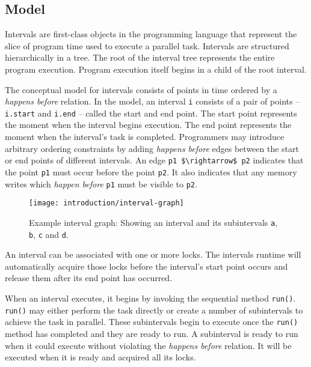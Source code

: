 \subsection{Model}
\label{sec:intro-intervals-model}

Intervals are first-class objects in the programming language that
represent the slice of program time used to execute a parallel
task. Intervals are structured hierarchically in a tree. The root of
the interval tree represents the entire program execution. Program
execution itself begins in a child of the root interval.

The conceptual model for intervals consists of points in time ordered
by a \emph{happens before} relation. In the model, an interval
\lstinline|i| consists of a pair of points -- \lstinline|i.start| and
\lstinline|i.end| -- called the start and end point. The start point
represents the moment when the interval begins execution. The end
point represents the moment when the interval's task is
completed. Programmers may introduce arbitrary ordering constraints by
adding \emph{happens before} edges between the start or end points of
different intervals. An edge \lstinline|p1 $\rightarrow$ p2| indicates
that the point \lstinline|p1| must occur before the point
\lstinline|p2|. It also indicates that any memory writes which
\emph{happen before} \lstinline|p1| must be visible to
\lstinline|p2|.

\begin{figure}[htb]
  \centering
  \texttt{[image: introduction/interval-graph]}
  \caption[Example interval graph]{Example interval graph: Showing an
    interval and its subintervals \lstinline|a|, \lstinline|b|,
    \lstinline|c| and \lstinline|d|.}
  \label{fig:interval-graph}
\end{figure}

An interval can be associated with one or more locks. The intervals
runtime will automatically acquire those locks before the interval's
start point occurs and release them after its end point has occurred.

When an interval executes, it begins by invoking the sequential method
\lstinline|run()|. \lstinline|run()| may either perform the task
directly or create a number of subintervals to achieve the task in
parallel. These subintervals begin to execute once the
\lstinline|run()| method has completed and they are ready to run. A
subinterval is ready to run when it could execute without violating
the \emph{happens before} relation. It will be executed when it is
ready and acquired all its locks.

